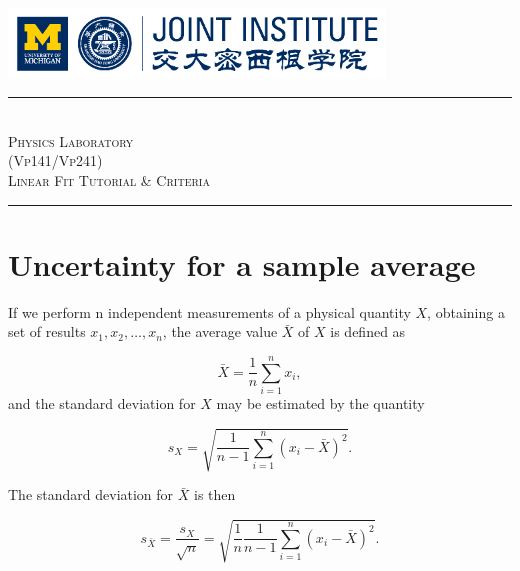 \documentclass[12pt]{article}
\begin{document}
\begin{titlepage}

\newcommand{\HRule}{\rule{\linewidth}{0.2mm}}

\begin{center}

\includegraphics[width=10cm]{logo.png}
\HRule \\[4cm]
\textsc{\large Physics Laboratory}\\
\textsc{\large(Vp141/Vp241)}\\
\vspace{4cm}
\textsc{\Large Linear Fit Tutorial \& Criteria}\\

\vspace{8.3cm}
\HRule

\vspace{-1.45em}

\begin{flushright}
\end{flushright}
\end{center}
\end{titlepage}

\section{Uncertainty for a sample average}

If we perform n independent measurements of a physical quantity $X$, obtaining a set of results $x_1,x_2,\ldots,x_n$, the average value $\bar{X}$ of $X$ is defined as

\begin{equation}
\bar{X}=\frac{1}{n}\sum_{i=1}^nx_i,
\end{equation}
and the standard deviation for $X$ may be estimated by the quantity

\begin{equation}
s_X=\sqrt{\frac{1}{n-1}\sum_{i=1}^n(x_i-\bar{X})^2}.
\end{equation}

\par The standard deviation for $\bar{X}$ is then

\begin{equation*}
s_{\bar{X}}=\frac{s_X}{\sqrt{n}}=\sqrt{\frac{1}{n}\frac{1}{n-1}\sum_{i=1}^n(x_i-\bar{X})^2}.
\end{equation*}
\end{document}
